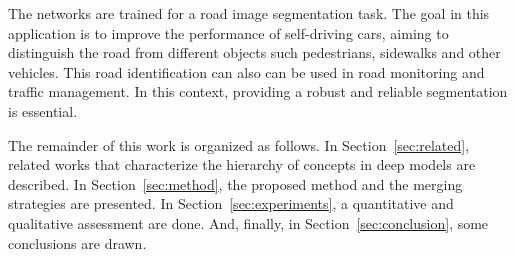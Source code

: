 The networks are trained for a road image segmentation task. The goal in this application is to improve the performance of self-driving cars, aiming to distinguish the road from different objects such pedestrians, sidewalks and other vehicles. This road identification can also can be used in road monitoring and traffic management. In this context, providing a robust and reliable segmentation is essential.
 

The remainder of this work is organized as follows. In Section~\ref{sec:related}, related works that characterize the hierarchy of concepts in deep models are described. In Section~\ref{sec:method}, the proposed method and the merging strategies are presented. In Section~\ref{sec:experiments}, a quantitative and qualitative assessment are done. And, finally, in Section~\ref{sec:conclusion}, some conclusions are drawn.
